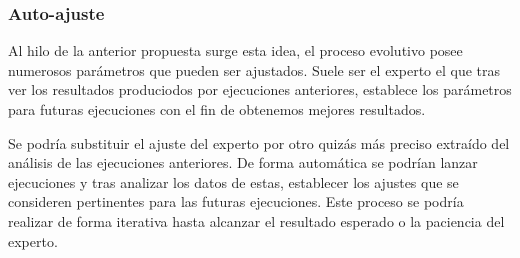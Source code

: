 \subsubsection{Auto-ajuste}

Al hilo de la anterior propuesta surge esta idea, el proceso evolutivo posee numerosos par\'ametros que pueden ser ajustados. Suele ser el experto el que tras ver los resultados produciodos por ejecuciones anteriores, establece los par\'ametros para futuras ejecuciones con el fin de obtenemos mejores resultados.

Se podr\'ia substituir el ajuste del experto por otro quiz\'as m\'as preciso extraído del análisis de las ejecuciones anteriores. De forma autom\'atica se podr\'ian lanzar ejecuciones y tras analizar los datos de estas, establecer los ajustes que se consideren pertinentes para las futuras ejecuciones. Este proceso se podr\'ia realizar de forma iterativa hasta alcanzar el resultado esperado o la paciencia del experto.














